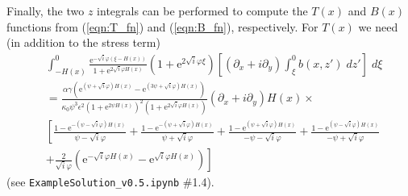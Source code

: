 \documentclass[10pt]{amsart}
\begin{document}
 Finally, the two $z$ integrals can be performed to compute the $T(x)$ and $B(x)$  functions from (\ref{eqn:T_fn}) and (\ref{eqn:B_fn}), respectively.
 For $T(x)$ we need (in addition to the stress term)
 \begin{align}
& \int_{-H(x)}^{0} 
\frac{ \mathrm{e}^{-\sqrt{i} \varphi (\xi - H(x))  } }{ 1 + \mathrm{e}^{2 \sqrt{i} \varphi H \left(x \right)} }
\left( 1 + \mathrm{e}^{2 \sqrt{i} \varphi \xi}\right) 
 \left[ \left(\partial_x  + i \partial_y\right)  \int_{\xi}^{0} b(x,z') \; dz'   \right] \; d \xi  \nonumber \\
& = 
\frac{  \alpha  \gamma \left( \mathrm{e}^{\left( \psi  + \sqrt{i} \varphi \right) H(x) } - \mathrm{e}^{\left( 3 \psi  + \sqrt{i} \varphi \right) H(x) } \right)   }
 {\kappa_0  \psi^{3} \epsilon^{2} \left( 1 + \mathrm{e}^{2 \psi H(x)} \right)^{2} \left( 1 + \mathrm{e}^{2 \sqrt{i} \varphi H \left(x \right)}  \right)}
 \left( \partial_x  + i \partial_y \right) H(x) \times \nonumber \\
& \left[ 
   \frac{1 -\mathrm{e}^{-\left( \psi - \sqrt{i} \varphi \right) H(x) }} { \psi - \sqrt{i} \varphi }  
+ \frac{1 - \mathrm{e}^{-\left( \psi + \sqrt{i} \varphi \right) H(x)}}{ \psi + \sqrt{i} \varphi }
+ \frac{1 - \mathrm{e}^{\left( \psi + \sqrt{i} \varphi \right) H(x) }}{ -\psi - \sqrt{i} \varphi }  
+ \frac{1 - \mathrm{e}^{ \left( \psi - \sqrt{i} \varphi \right) H(x)}}{ -\psi + \sqrt{i} \varphi } 
\right. \nonumber \\  & \left. 
+ \frac{2}{\sqrt{i} \varphi} \left( \mathrm{e}^{-\sqrt{i} \varphi H(x) } - \mathrm{e}^{ \sqrt{i} \varphi H(x)} \right) 
\right] \nonumber
\end{align}
(see \texttt{ExampleSolution\_v0.5.ipynb} \#1.4).
\end{document}
